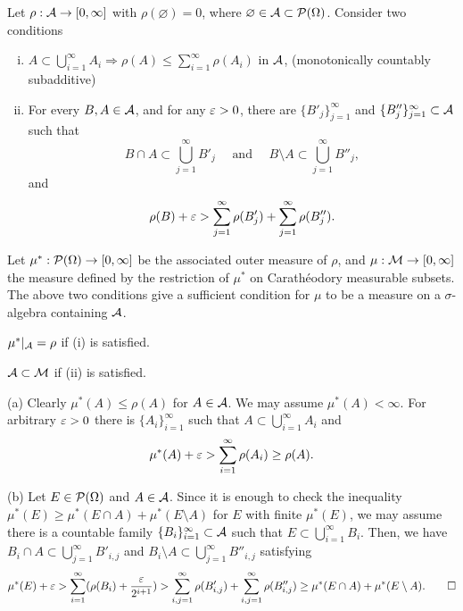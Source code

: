 \documentclass{../note}
\begin{document}
\begin{prb}
Let $\rho:\mathcal{A}\to[0,\infty]$ with $\rho(\varnothing)=0$, where $\varnothing\in\mathcal{A}\subset\mathcal{P}(\Omega)$.
Consider two conditions
\begin{enumerate}[(i)]
\item $A\subset\bigcup_{i=1}^\infty A_i\Rightarrow\rho(A)\le\sum_{i=1}^\infty\rho(A_i)$ in $\mathcal{A}$,
\hfill{(monotonically countably subadditive)}
\item For every $B,A\in\mathcal{A}$, and for any $\varepsilon>0$, there are $\{B'_j\}_{j=1}^\infty$ and $\{B''_j\}_{j=1}^\infty\subset\mathcal{A}$ such that
\[B\cap A\subset\bigcup_{j=1}^\infty B'_j\quad\text{ and }\quad B\setminus A\subset\bigcup_{j=1}^\infty B''_j,\]
and
\[\rho(B)+\varepsilon>\sum_{j=1}^\infty\rho(B'_j)+\sum_{j=1}^\infty\rho(B''_j).\]
\end{enumerate}
Let $\mu^*:\mathcal{P}(\Omega)\to[0,\infty]$ be the associated outer measure of $\rho$, and $\mu:\mathcal{M}\to[0,\infty]$ the measure defined by the restriction of $\mu^*$ on Carath\'eodory measurable subsets.
The above two conditions give a sufficient condition for $\mu$ to be a measure on a $\sigma$-algebra containing $\mathcal{A}$.
\begin{parts}
\item $\mu^*|_{\mathcal{A}}=\rho$ if (i) is satisfied.
\item $\mathcal{A}\subset\mathcal{M}$ if (ii) is satisfied.
\end{parts}
\end{prb}
\begin{pf}
(a)
Clearly $\mu^*(A)\le\rho(A)$ for $A\in\mathcal{A}$.
We may assume $\mu^*(A)<\infty$.
For arbitrary $\varepsilon>0$ there is $\{A_i\}_{i=1}^\infty$ such that $A\subset\bigcup_{i=1}^\infty A_i$ and
\[\mu^*(A)+\varepsilon>\sum_{i=1}^\infty\rho(A_i)\ge\rho(A).\]

(b)
Let $E\in\mathcal{P}(\Omega)$ and $A\in\mathcal{A}$.
Since it is enough to check the inequality $\mu^*(E)\ge\mu^*(E\cap A)+\mu^*(E\setminus A)$ for $E$ with finite $\mu^*(E)$, we may assume there is a countable family $\{B_i\}_{i=1}^\infty\subset\mathcal{A}$ such that $E\subset\bigcup_{i=1}^\infty B_i$.
Then, we have $B_i\cap A\subset\bigcup_{j=1}^\infty B'_{i,j}$ and $B_i\setminus A\subset\bigcup_{j=1}^\infty B''_{i,j}$ satisfying
\[\mu^*(E)+\varepsilon>\sum_{i=1}^\infty(\rho(B_i)+\frac{\varepsilon}{2^{i+1}})
>\sum_{i,j=1}^\infty\rho(B'_{i,j})+\sum_{i,j=1}^\infty\rho(B''_{i,j})\ge\mu^*(E\cap A)+\mu^*(E\setminus A).\qedhere\]
\end{pf}
\end{document}
